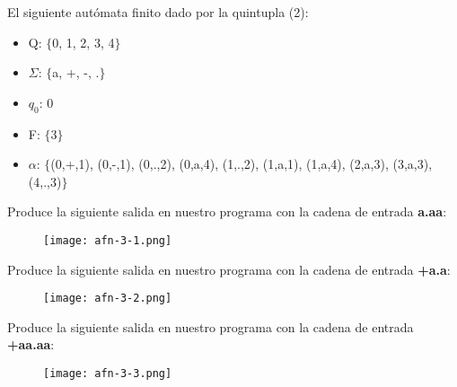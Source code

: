 El siguiente autómata finito dado por la quintupla (2):

\begin{itemize}
\item Q: $\{$0, 1, 2, 3, 4$\}$
\item $\Sigma$: $\{$a, +, -, .$\}$
\item $q_{0}$: 0
\item F: $\{$3$\}$
\item $\alpha$: $\{$(0,+,1), (0,-,1), (0,.,2), (0,a,4), (1,.,2), (1,a,1), (1,a,4), (2,a,3), (3,a,3), (4,.,3)$\}$
\end{itemize}

Produce la siguiente salida en nuestro programa con la cadena de entrada \textbf{a.aa}:

\begin{figure}[H]
\texttt{[image: afn-3-1.png]}
\centering \linebreak {}
\end{figure} 

Produce la siguiente salida en nuestro programa con la cadena de entrada \textbf{+a.a}:

\begin{figure}[H]
\texttt{[image: afn-3-2.png]}
\centering \linebreak {}
\end{figure} 

Produce la siguiente salida en nuestro programa con la cadena de entrada \textbf{+aa.aa}:

\begin{figure}[H]
\texttt{[image: afn-3-3.png]}
\centering \linebreak {}
\end{figure} 